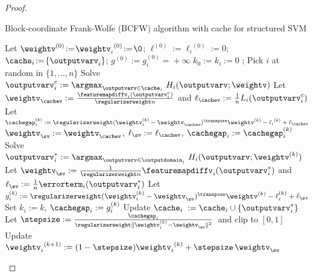 \documentclass{article}
\begin{document}
\begin{proof}
\begin{algorithm}[t!]
    \caption{Block-coordinate Frank-Wolfe (BCFW) algorithm with cache for structured SVM \label{alg:FW_product_SVM_caching}}%
    \begin{algorithmic}[1]
        \STATE Let $\weightv^{(0)}\!:=\!{\weightv_i}^{(0)}\!:=\!\0$; \; $\ell^{(0)}\!:=\!{\ell_i}^{(0)}\!:=\!0$; \; $\cache_i\!:=\!\{\outputvarv_i\}$;
        \STATE $g^{(0)}\!:=\!g_i^{(0)}\!=\!+\infty$
        \STATE $k_0\!:=\!k_i\!:=\!0$ ; \; 
        \STATE Pick $i$ at random in $\{1,\ldots,n\}$ \label{alg:FW_product_SVM_caching:randomSample}
        \STATE Solve $\outputvarv_i^c := \argmax_{\outputvarv\in\cache_i} \ H_i(\outputvarv;\weightv)$ 
        \STATE Let $\weightv_{\cachev} := \frac{ \featuremapdiffv_i(\outputvarv_i^c)}{\regularizerweight n}$ \; 
        and \; $\ell_{\cachev}:=\frac1n L_i(\outputvarv_i^c)$
        \STATE Let $\cachegap_i^{(k)} := \regularizerweight(\weightv_i^{(k)}-\weightv_{\cachev})^\transpose \weightv^{(k)}-{\ell_i}^{(k)}+\ell_{\cachev}$
         
        \STATE $\weightv_{\sv}:= \weightv_{\cachev}$, $\ell_{\sv} := \ell_{\cachev}$, $\cachegap_i := \cachegap_i^{(k)}$
        \ELSE {}
        \STATE Solve $\outputvarv_i^* := \displaystyle\argmax_{\outputvarv\in\outputdomain_i} \ H_i(\outputvarv;\weightv^{(k)})$  
        \STATE Let $\weightv_{\sv} := \frac1{\regularizerweight n} \featuremapdiffv_i(\outputvarv_i^*)$ \;
        and\; $\ell_{\sv} := \frac1n \errorterm_i(\outputvarv_i^*)$
        \STATE Let $g_i^{(k)} :=  \regularizerweight (\weightv_i^{(k)}-\weightv_{\sv})^\transpose \weightv^{(k)} - \ell_i^{(k)} + \ell_{\sv}$\label{alg:FW_product_SVM_caching:block_gap}
        \STATE Set $k_i := k$, $\cachegap_i := g_i^{(k)}$
        \STATE Update ${\cache_i}\;:= {\cache_i} \cup \{\outputvarv_i^* \}$  
        \ENDIF 
        \STATE Let $\stepsize := \frac{ \cachegap_i }{ \regularizerweight \|\weightv_i^{(k)}-\weightv_{\sv}\|^2}$~and clip to $[0,1]$ \label{alg:FW_product_SVM_caching:line_search}
        \STATE Update ${\weightv_i}^{(k+1)}:= (1-\stepsize){\weightv_i}^{(k)}+\stepsize \,\weightv_{\sv}$

\end{algorithmic}
\end{algorithm}
\end{proof}
\end{document}

